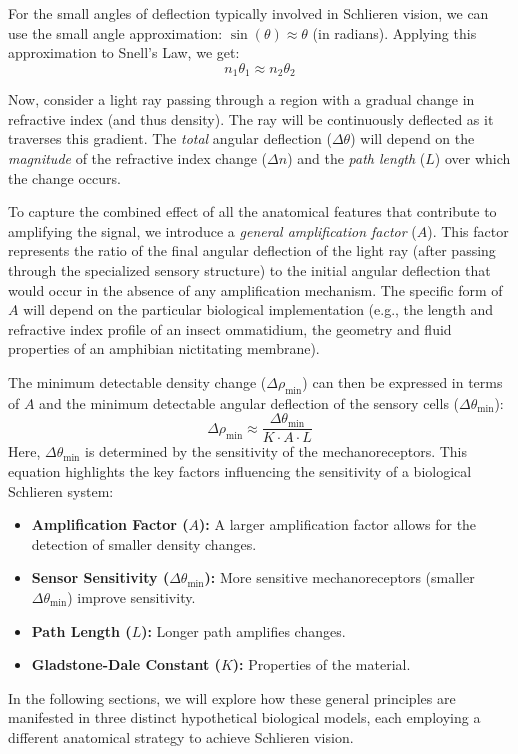 \documentclass[11pt]{article}
\begin{document}
For the small angles of deflection typically involved in Schlieren vision, we can use the small angle approximation: $\sin(\theta) \approx \theta$ (in radians). Applying this approximation to Snell's Law, we get:
\[n_1\theta_1 \approx n_2\theta_2\]

Now, consider a light ray passing through a region with a gradual change in refractive index (and thus density). The ray will be continuously deflected as it traverses this gradient. The \textit{total} angular deflection ($\Delta\theta$) will depend on the \textit{magnitude} of the refractive index change ($\Delta n$) and the \textit{path length} ($L$) over which the change occurs.

To capture the combined effect of all the anatomical features that contribute to amplifying the signal, we introduce a \textit{general amplification factor} ($A$). This factor represents the ratio of the final angular deflection of the light ray (after passing through the specialized sensory structure) to the initial angular deflection that would occur in the absence of any amplification mechanism. The specific form of $A$ will depend on the particular biological implementation (e.g., the length and refractive index profile of an insect ommatidium, the geometry and fluid properties of an amphibian nictitating membrane).

The minimum detectable density change ($\Delta\rho_{\text{min}}$) can then be expressed in terms of $A$ and the minimum detectable angular deflection of the sensory cells ($\Delta\theta_{\text{min}}$):
\[\Delta\rho_{\text{min}} \approx \frac{\Delta\theta_{\text{min}}}{K \cdot A \cdot L}\]
Here, $\Delta\theta_{\text{min}}$ is determined by the sensitivity of the mechanoreceptors. This equation highlights the key factors influencing the sensitivity of a biological Schlieren system:
\begin{itemize}
    \item \textbf{Amplification Factor ($A$):} A larger amplification factor allows for the detection of smaller density changes.
    \item \textbf{Sensor Sensitivity ($\Delta\theta_{\text{min}}$):} More sensitive mechanoreceptors (smaller $\Delta\theta_{\text{min}}$) improve sensitivity.
    \item \textbf{Path Length ($L$):} Longer path amplifies changes.
    \item \textbf{Gladstone-Dale Constant ($K$):} Properties of the material.
\end{itemize}
In the following sections, we will explore how these general principles are manifested in three distinct hypothetical biological models, each employing a different anatomical strategy to achieve Schlieren vision.
\end{document}
